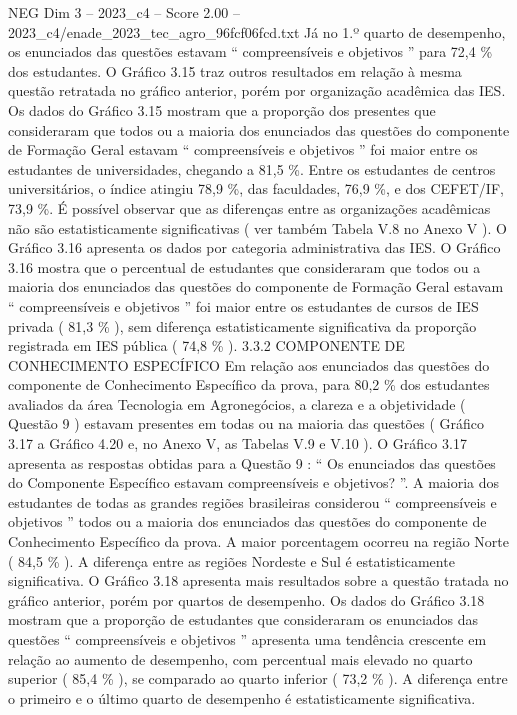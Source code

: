 \begin{textsample}{NEG Dim 3 – 2023\_c4 – Score 2.00 – 2023\_c4/enade\_2023\_tec\_agro\_96fcf06fcd.txt}
Já no 1.º quarto de desempenho, os enunciados das questões estavam “ compreensíveis e objetivos ” para 72,4 \% dos estudantes.
O Gráfico 3.15 traz outros resultados em relação à mesma questão retratada no gráfico anterior, porém por organização acadêmica das IES.
Os dados do Gráfico 3.15 mostram que a proporção dos presentes que consideraram que todos ou a maioria dos enunciados das questões do componente de Formação Geral estavam “ compreensíveis e objetivos ” foi maior entre os estudantes de universidades, chegando a 81,5 \%.
Entre os estudantes de centros universitários, o índice atingiu 78,9 \%, das faculdades, 76,9 \%, e dos CEFET/IF, 73,9 \%.
É possível observar que as diferenças entre as organizações acadêmicas não são estatisticamente significativas ( ver também Tabela V.8 no Anexo V ).
O Gráfico 3.16 apresenta os dados por categoria administrativa das IES.
O Gráfico 3.16 mostra que o percentual de estudantes que consideraram que todos ou a maioria dos enunciados das questões do componente de Formação Geral estavam “ compreensíveis e objetivos ” foi maior entre os estudantes de cursos de IES privada ( 81,3 \% ), sem diferença estatisticamente significativa da proporção registrada em IES pública ( 74,8 \% ). 3.3.2 COMPONENTE DE CONHECIMENTO ESPECÍFICO Em relação aos enunciados das questões do componente de Conhecimento Específico da prova, para 80,2 \% dos estudantes avaliados da área Tecnologia em Agronegócios, a clareza e a objetividade ( Questão 9 ) estavam presentes em todas ou na maioria das questões ( Gráfico 3.17 a Gráfico 4.20 e, no Anexo V, as Tabelas V.9 e V.10 ).
O Gráfico 3.17 apresenta as respostas obtidas para a Questão 9 : “ Os enunciados das questões do Componente Específico estavam compreensíveis e objetivos? ”.
A maioria dos estudantes de todas as grandes regiões brasileiras considerou “ compreensíveis e objetivos ” todos ou a maioria dos enunciados das questões do componente de Conhecimento Específico da prova.
A maior porcentagem ocorreu na região Norte ( 84,5 \% ).
A diferença entre as regiões Nordeste e Sul é estatisticamente significativa.
O Gráfico 3.18 apresenta mais resultados sobre a questão tratada no gráfico anterior, porém por quartos de desempenho.
Os dados do Gráfico 3.18 mostram que a proporção de estudantes que consideraram os enunciados das questões “ compreensíveis e objetivos ” apresenta uma tendência crescente em relação ao aumento de desempenho, com percentual mais elevado no quarto superior ( 85,4 \% ), se comparado ao quarto inferior ( 73,2 \% ).
A diferença entre o primeiro e o último quarto de desempenho é estatisticamente significativa.

\end{textsample}
